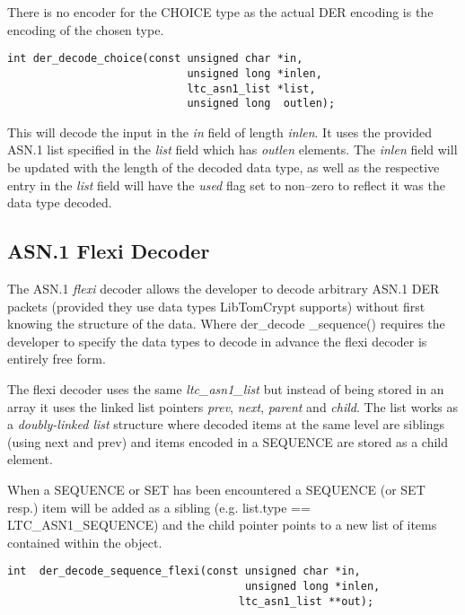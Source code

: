 \documentclass[synpaper]{book}
\begin{document}
There is no encoder for the CHOICE type as the actual DER encoding is the encoding of the chosen type.  

\begin{verbatim}
int der_decode_choice(const unsigned char *in, 
                            unsigned long *inlen,
                            ltc_asn1_list *list, 
                            unsigned long  outlen);
\end{verbatim}

This will decode the input in the \textit{in} field of length \textit{inlen}.  It uses the provided ASN.1 list specified in the \textit{list} field which has 
\textit{outlen} elements.  The \textit{inlen} field will be updated with the length of the decoded data type, as well as the respective entry in the \textit{list} field 
will have the \textit{used} flag set to non--zero to reflect it was the data type decoded.

\subsection{ASN.1 Flexi Decoder}
The ASN.1 \textit{flexi} decoder allows the developer to decode arbitrary ASN.1 DER packets (provided they use data types LibTomCrypt supports) without first knowing
the structure of the data.  Where der\_decode \_sequence() requires the developer to specify the data types to decode in advance the flexi decoder is entirely
free form.

The flexi decoder uses the same \textit{ltc\_asn1\_list} but instead of being stored in an array it uses the linked list pointers \textit{prev}, \textit{next}, \textit{parent} 
and \textit{child}.  The list works as a \textit{doubly-linked list} structure where decoded items at the same level are siblings (using next and prev) and items
encoded in a SEQUENCE are stored as a child element.

When a SEQUENCE or SET has been encountered a SEQUENCE (or SET resp.) item will be added as a sibling (e.g. list.type == LTC\_ASN1\_SEQUENCE) and the child 
pointer points to a new list of items contained within the object.

\begin{verbatim}
int  der_decode_sequence_flexi(const unsigned char *in, 
                                     unsigned long *inlen, 
                                    ltc_asn1_list **out);
\end{verbatim}
\end{document}
